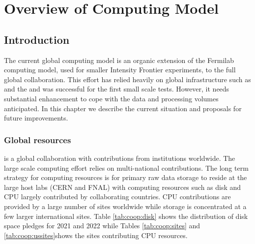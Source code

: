 \documentclass[../main-v1.tex]{subfiles}
\begin{document}
\chapter{Overview of Computing Model }
\label{ch:cm}

\section{Introduction}\label{ch:cm:intro} %






The current  global computing model is an organic extension of the Fermilab  computing model, used for smaller Intensity Frontier experiments, to the full global collaboration.  This effort  has relied heavily on global infrastructure such as  and the  and was successful for the first small scale  tests. However, it needs substantial enhancement to cope with the data and processing volumes anticipated.  In this chapter we describe the current situation and proposals for future improvements. 

\subsection{Global resources}

 is a global collaboration with contributions from institutions worldwide.  The large scale computing effort relies on multi-national contributions. The long term strategy for computing resources is for primary raw data storage to reside at the large host labs (CERN and FNAL) with computing resources such as disk and CPU largely contributed by collaborating countries.   CPU contributions are provided by a large number of sites worldwide while storage is concentrated at a few larger international sites. Table \ref{tab:coop:disk} shows the distribution of disk space pledges for 2021 and 2022 while Tables \ref{tab:coop:sites} and \ref{tab:coop:ussites}shows the sites contributing CPU resources. 



\end{document}
